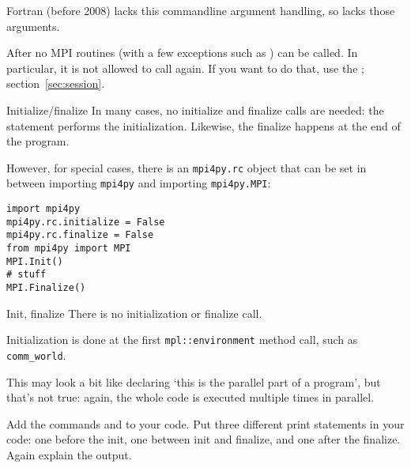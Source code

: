 Fortran (before 2008) lacks this commandline argument handling,
so  lacks those arguments.

After  no MPI routines
(with a few exceptions such as )
can be called.
In particular, it is not allowed to call  again.
If you want to do that, use the ; section~\ref{sec:session}.

\begin{pythonnote}{Initialize/finalize}
  In many cases,  no initialize and finalize calls are needed:
  the statement
  performs the initialization.
  Likewise, the finalize happens at the end of the program.

  However, for special cases, there is an \lstinline{mpi4py.rc} object
  that can be set in between importing \lstinline{mpi4py} and
  importing \lstinline{mpi4py.MPI}:
\begin{lstlisting}
import mpi4py
mpi4py.rc.initialize = False
mpi4py.rc.finalize = False
from mpi4py import MPI
MPI.Init()
# stuff
MPI.Finalize()
\end{lstlisting}
\end{pythonnote}

\begin{mplnote}{Init, finalize}
  There is no initialization or finalize call.
  \begin{mplimpl}
    Initialization is done at the first \lstinline+mpl::environment+ method call,
    such as \lstinline+comm_world+.
  \end{mplimpl}

\end{mplnote}

This may look a bit like declaring `this is the parallel part of a
program', but that's not true: again, the whole code is executed
multiple times in parallel.

\begin{exercise}
  \label{ex:hello2}
  Add the commands  and 
  to your code. Put three different print statements in your code: one before the init,
  one between init and finalize, and one after the finalize. Again explain the output.
\end{exercise}


